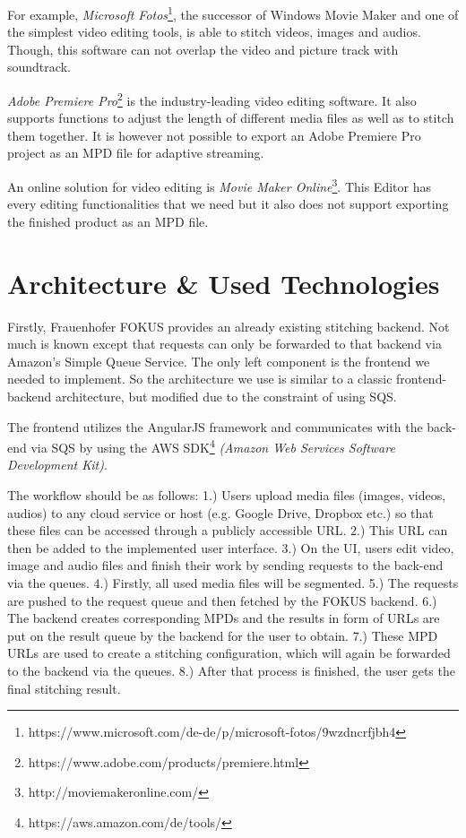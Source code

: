 \documentclass[conference]{IEEEtran}
\begin{document}
For example, \textit{Microsoft Fotos}\footnote{https://www.microsoft.com/de-de/p/microsoft-fotos/9wzdncrfjbh4}, the successor of Windows Movie Maker and one of the simplest video editing tools, is able to stitch videos, images and audios.
Though, this software can not overlap the video and picture track with soundtrack.

\textit{Adobe Premiere Pro}\footnote{https://www.adobe.com/products/premiere.html} is the industry-leading video editing software.
It also supports functions to adjust the length of different media files as well as to stitch them together.
It is however not possible to export an Adobe Premiere Pro project as an MPD file for adaptive streaming.

An online solution for video editing is \textit{Movie Maker Online}\footnote{http://moviemakeronline.com/}.
This Editor has every editing functionalities that we need but it also does not support exporting the finished product as an MPD file.

\section{Architecture \& Used Technologies}
Firstly, Frauenhofer FOKUS provides an already existing stitching backend.
Not much is known except that requests can only be forwarded to that backend via Amazon's Simple Queue Service.
The only left component is the frontend we needed to implement.
So the architecture we use is similar to a classic frontend-backend architecture, but modified due to the constraint of using SQS.

The frontend utilizes the AngularJS framework and communicates with the back-end via SQS by using the AWS SDK\footnote{https://aws.amazon.com/de/tools/} \textit{(Amazon Web Services Software Development Kit)}.

The workflow should be as follows:
1.) Users upload media files (images, videos, audios) to any cloud service or host (e.g. Google Drive, Dropbox etc.) so that these files can be accessed through a publicly accessible URL.
2.) This URL can then be added to the implemented user interface.
3.) On the UI, users edit video, image and audio files and finish their work by sending requests to the back-end via the queues.
4.) Firstly, all used media files will be segmented.
5.) The requests are pushed to the request queue and then fetched by the FOKUS backend.
6.) The backend creates corresponding MPDs and the results in form of URLs are put on the result queue by the backend for the user to obtain.
7.) These MPD URLs are used to create a stitching configuration, which will again be forwarded to the backend via the queues.
8.) After that process is finished, the user gets the final stitching result.
\end{document}
